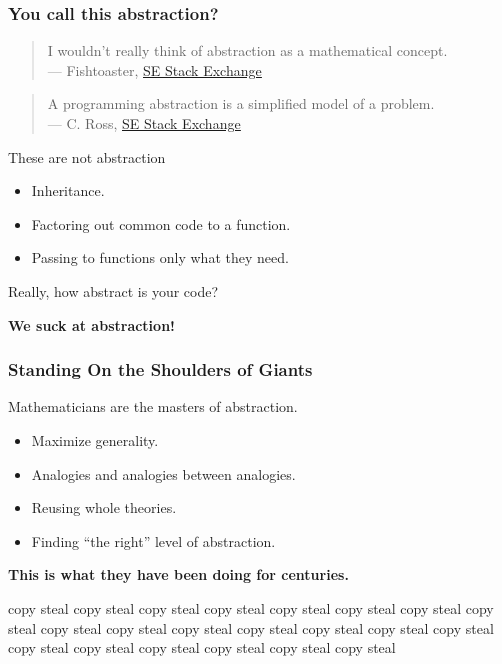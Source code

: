 \documentclass{beamer}
\begin{document}
\begin{frame}
  \frametitle{You call this abstraction?}
  \begin{quote}
    I wouldn't really think of abstraction as a mathematical concept. \\[1ex] \rightline
  {{\rm --- Fishtoaster,
      \href{https://softwareengineering.stackexchange.com/questions/16070/what-is-abstraction}{\underline{SE Stack Exchange}}}}
  \end{quote}

  \begin{quote}
    A programming abstraction is a simplified model of a problem. \\[1ex] \rightline
  {{\rm --- C. Ross,
      \href{https://softwareengineering.stackexchange.com/questions/16070/what-is-abstraction}{\underline{SE Stack Exchange}}}}
  \end{quote}

  \pause

  \begin{block}{These are not abstraction}
  \begin{itemize}
    \item Inheritance.
    \item Factoring out common code to a function.
    \item Passing to functions only what they need.
  \end{itemize}
  \end{block}

  Really, how abstract is your code?

  \begin{center}
    \LARGE
    \bfseries
  We suck at abstraction!
  \end{center}

\end{frame}

\begin{frame}
  \frametitle{Standing On the Shoulders of Giants}
  Mathematicians are the \alert{masters of abstraction.}
  \begin{itemize}
  \item Maximize generality.
  \item Analogies and analogies between analogies.
  \item Reusing whole theories.
  \item Finding ``the right'' level of abstraction.
  \end{itemize}

  \pause

  \begin{center}
    \Large
    \bfseries
  This is what they have been doing for centuries.
  \end{center}

  \begin{block}{}
  copy steal copy steal copy steal
  copy steal copy steal copy steal
  copy steal copy steal copy steal
  copy steal copy steal copy steal
  copy steal copy steal copy steal
  copy steal copy steal copy steal
  copy steal copy steal copy steal
  \end{block}

\end{frame}
\end{document}
